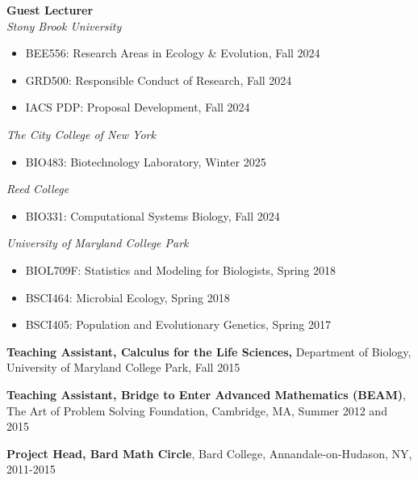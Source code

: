 \documentclass[]{res}
\begin{document}
\begin{resume}
{\bf Guest Lecturer} \\
\emph{Stony Brook University}
\begin{itemize} \itemsep -2pt
\item BEE556: Research Areas in Ecology \& Evolution, Fall 2024
\item GRD500: Responsible Conduct of Research, Fall 2024
\item IACS PDP: Proposal Development, Fall 2024
\end{itemize}
\emph{The City College of New York}
\begin{itemize} \itemsep -2pt
\item BIO483: Biotechnology Laboratory, Winter 2025
\end{itemize}
\emph{Reed College}
\begin{itemize} \itemsep -2pt
\item BIO331: Computational Systems Biology, Fall 2024
\end{itemize}
\emph{University of Maryland College Park}
\begin{itemize} \itemsep -2pt
\item BIOL709F: Statistics and Modeling for Biologists, Spring 2018
\item BSCI464: Microbial Ecology, Spring 2018 
\item BSCI405: Population and Evolutionary Genetics, Spring 2017
\end{itemize}

{\bf Teaching Assistant, Calculus for the Life Sciences,} Department of Biology, University of Maryland College Park, Fall 2015%

{\bf Teaching Assistant, Bridge to Enter Advanced Mathematics (BEAM)}, The Art of Problem Solving Foundation, Cambridge, MA, Summer 2012 and 2015 %

{\bf Project Head, Bard Math Circle}, Bard College, Annandale-on-Hudason, NY, 2011-2015


\end{resume}
\end{document}
